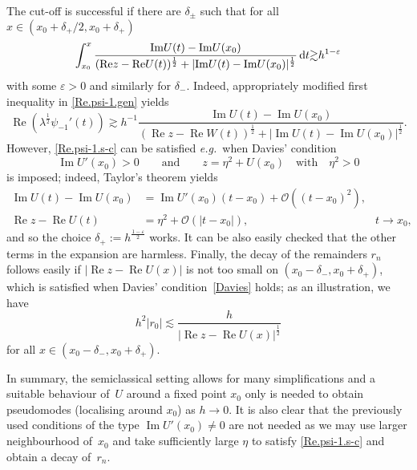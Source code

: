 \begin{Example}
The cut-off is successful if there are $\delta_\pm$ such that for all $x \in (x_0 + \delta_+/2,x_0 + \delta_+)$
\begin{equation}\label{Re.psi-1.s-c}
\int_{x_0}^{x} \frac{{\operatorname{Im}} U(t) - {\operatorname{Im}} U(x_0)}{({\operatorname{Re}} z-{\operatorname{Re}} U(t))^\frac12 
+ |{\operatorname{Im}} U(t) - {\operatorname{Im}} U(x_0)|^\frac 12} \, {\mathrm{d}} t
\\
{\gtrsim}  h^{1-{\varepsilon}}
\end{equation}
with some ${\varepsilon} >0$ and similarly for $\delta_-$. Indeed, appropriately modified first inequality in \eqref{Re.psi-1.gen} yields
\begin{equation}
{\operatorname{Re}} (\lambda^\frac 12 \psi_{-1}'(t)) {\gtrsim} h^{-1} \frac{{\operatorname{Im}} U(t) 
- {\operatorname{Im}} U(x_0)}{({\operatorname{Re}} z-{\operatorname{Re}} W(t))^\frac12 + |{\operatorname{Im}} U(t) - {\operatorname{Im}} U(x_0)|^\frac 12}.
\end{equation}
However, \eqref{Re.psi-1.s-c} can be satisfied {\emph{e.g.}}~when 
Davies' condition \cite{Davies_1999-NSA}
\begin{equation}\label{Davies}
  {\operatorname{Im}} U'(x_0) >0
  \qquad \mbox{and} \qquad
  z = \eta^2 + U(x_0) 
  \quad \mbox{with} \quad \eta^2>0
\end{equation}
is imposed; indeed, Taylor's theorem yields 
\begin{equation}
\begin{aligned}
{\operatorname{Im}} U(t) - {\operatorname{Im}} U(x_0) &= {\operatorname{Im}} U'(x_0)(t-x_0) + {\mathcal{O}}((t-x_0)^2),&
\\
{\operatorname{Re}} z - {\operatorname{Re}} U(t) &= \eta^2+ {\mathcal{O}}(|t-x_0|), &t \to x_0,
\end{aligned}
\end{equation}
and so the choice $\delta_+ := h^\frac{1-{\varepsilon}}2$ works.
It can be also easily checked that the other terms in the expansion are harmless. Finally, the decay of the remainders $r_n$ follows easily if $|{\operatorname{Re}} z - {\operatorname{Re}} U(x)|$ is not too small 
on $(x_0-\delta_-,x_0+\delta_+)$, 
which is satisfied when 
Davies' condition~\eqref{Davies} holds; 
as an illustration, we have
\begin{equation}
h^2 |r_0| {\lesssim} \frac{h}{|{\operatorname{Re}} z - {\operatorname{Re}} U(x)|^\frac 12}
\end{equation}
for all $x \in (x_0-\delta_-,x_0+\delta_+)$.

In summary, the semiclassical setting allows for many simplifications and a suitable behaviour of~$U$ around a fixed point $x_0$ only is needed to obtain pseudomodes (localising around $x_0$) as $h \to 0$. It is also clear that the previously used conditions of 
the type ${\operatorname{Im}} U'(x_0)\neq 0$ are not needed as we may use larger neighbourhood of~$x_0$ and take sufficiently large $\eta$ to satisfy \eqref{Re.psi-1.s-c} and obtain a decay of~$r_n$. 
\end{Example}

